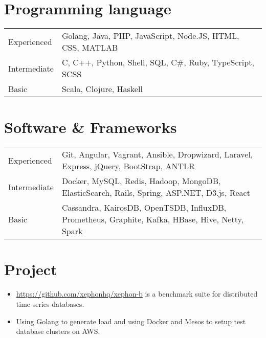 \documentclass[10pt, letterpaper]{simple-cv}
\begin{document}
\section{Programming language}
\begin{tabular}{ l l }
 Experienced &  Golang, Java, PHP, JavaScript, Node.JS, HTML, CSS, MATLAB \\
 Intermediate & C, C++, Python, Shell, SQL, C\#, Ruby, TypeScript, SCSS \\
 Basic & Scala, Clojure, Haskell
\end{tabular}

\section{Software \& Frameworks}
\begin{tabular}{ l l }
 Experienced & Git, Angular, Vagrant, Ansible, Dropwizard, Laravel, Express, jQuery, BootStrap, ANTLR\\
 Intermediate & Docker, MySQL, Redis, Hadoop, MongoDB, ElasticSearch, Rails, Spring, ASP.NET, D3.js, React \\
 Basic & Cassandra, KairosDB, OpenTSDB, InfluxDB, Prometheus, Graphite, Kafka, HBase, Hive, Netty, Spark
\end{tabular}

\section{Project}

\begin{itemize}
\item \url{https://github.com/xephonhq/xephon-b} is a benchmark suite for distributed time series databases.
\item Using Golang to generate load and using Docker and Mesos to setup test database clusters on AWS.
\end{itemize}
\end{document}

